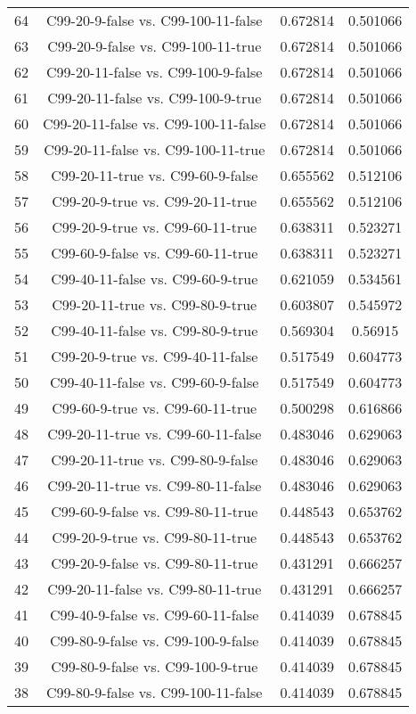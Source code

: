 \documentclass[a4paper,10pt]{article}
\begin{document}
\begin{landscape}
\begin{table}[!htp]
\begin{tabular}{cccc}
64&C99-20-9-false vs. C99-100-11-false&0.672814&0.501066\\
63&C99-20-9-false vs. C99-100-11-true&0.672814&0.501066\\
62&C99-20-11-false vs. C99-100-9-false&0.672814&0.501066\\
61&C99-20-11-false vs. C99-100-9-true&0.672814&0.501066\\
60&C99-20-11-false vs. C99-100-11-false&0.672814&0.501066\\
59&C99-20-11-false vs. C99-100-11-true&0.672814&0.501066\\
58&C99-20-11-true vs. C99-60-9-false&0.655562&0.512106\\
57&C99-20-9-true vs. C99-20-11-true&0.655562&0.512106\\
56&C99-20-9-true vs. C99-60-11-true&0.638311&0.523271\\
55&C99-60-9-false vs. C99-60-11-true&0.638311&0.523271\\
54&C99-40-11-false vs. C99-60-9-true&0.621059&0.534561\\
53&C99-20-11-true vs. C99-80-9-true&0.603807&0.545972\\
52&C99-40-11-false vs. C99-80-9-true&0.569304&0.56915\\
51&C99-20-9-true vs. C99-40-11-false&0.517549&0.604773\\
50&C99-40-11-false vs. C99-60-9-false&0.517549&0.604773\\
49&C99-60-9-true vs. C99-60-11-true&0.500298&0.616866\\
48&C99-20-11-true vs. C99-60-11-false&0.483046&0.629063\\
47&C99-20-11-true vs. C99-80-9-false&0.483046&0.629063\\
46&C99-20-11-true vs. C99-80-11-false&0.483046&0.629063\\
45&C99-60-9-false vs. C99-80-11-true&0.448543&0.653762\\
44&C99-20-9-true vs. C99-80-11-true&0.448543&0.653762\\
43&C99-20-9-false vs. C99-80-11-true&0.431291&0.666257\\
42&C99-20-11-false vs. C99-80-11-true&0.431291&0.666257\\
41&C99-40-9-false vs. C99-60-11-false&0.414039&0.678845\\
40&C99-80-9-false vs. C99-100-9-false&0.414039&0.678845\\
39&C99-80-9-false vs. C99-100-9-true&0.414039&0.678845\\
38&C99-80-9-false vs. C99-100-11-false&0.414039&0.678845\\

\end{tabular}
\end{table}
\end{landscape}
\end{document}
